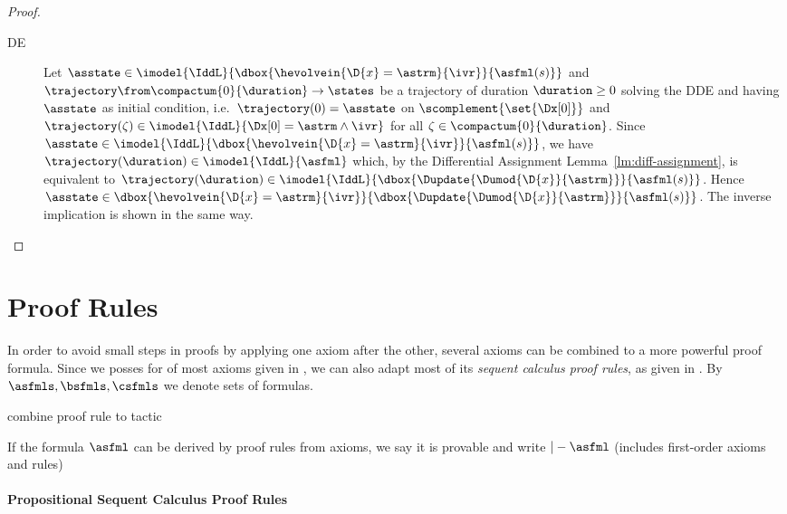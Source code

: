 \begin{proof}
\begin{description}
        \item[DE] Let $\asstate\in\imodel{\IddL}{\dbox{\hevolvein{\D{x}=\astrm}{\ivr}}{\asfml(s)}}$ and $\trajectory\from\compactum{0}{\duration}\to\states$ be a trajectory of duration $\duration\geq 0$ solving the DDE and having $\asstate$ as initial condition, i.e.\ $\trajectory(0)=\asstate$ on $\scomplement{\set{\Dx[0]}}$ and $\trajectory(\zeta)\in\imodel{\IddL}{\Dx[0]=\astrm\land\ivr}$ for all $\zeta\in\compactum{0}{\duration}$.
        Since $\asstate\in\imodel{\IddL}{\dbox{\hevolvein{\D{x}=\astrm}{\ivr}}{\asfml(s)}}$, we have $\trajectory(\duration)\in\imodel{\IddL}{\asfml}$ which, by the Differential Assignment Lemma~\ref{lm:diff-assignment}, is equivalent to $\trajectory(\duration)\in\imodel{\IddL}{\dbox{\Dupdate{\Dumod{\D{x}}{\astrm}}}{\asfml(s)}}$. Hence $\asstate\in\dbox{\hevolvein{\D{x}=\astrm}{\ivr}}{\dbox{\Dupdate{\Dumod{\D{x}}{\astrm}}}{\asfml(s)}}$.
        The inverse implication is shown in the same way.
    \end{description}
    \end{proof}

\section{Proof Rules}
    \label{sec:proof-rules}

    In order to avoid small steps in proofs by applying one axiom after the other, several axioms can be combined to a more powerful proof formula.
    Since we posses for \ddL of most axioms given in \dL, we can also adapt most of its \emph{sequent calculus proof rules}, as given in \cite{cheatsheet}.
    By $\asfmls,\bsfmls,\csfmls$ we denote sets of formulas.


        combine proof rule to tactic
    
    If the \ddL formula $\asfml$ can be derived by \ddL proof rules from \ddL axioms, we say it is provable and write $|-\asfml$
    (includes first-order axioms and rules)

    \paragraph{Propositional Sequent Calculus Proof Rules}
        \label{sec:propositional-rules}

